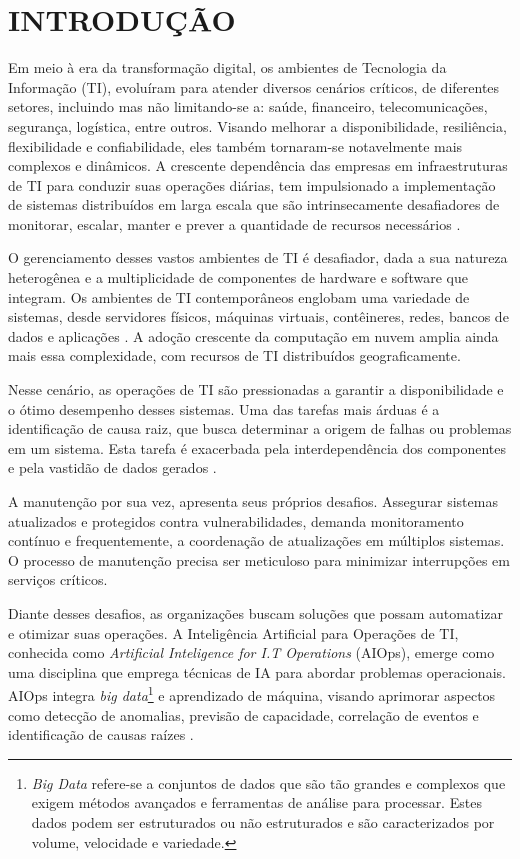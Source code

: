\chapter{INTRODUÇÃO} \label{cap_introducao}

Em meio à era da transformação digital, os ambientes de Tecnologia da Informação (TI), evoluíram para atender diversos cenários críticos, de diferentes setores, incluindo mas não limitando-se a: saúde, financeiro, telecomunicações, segurança, logística, entre outros. Visando melhorar a disponibilidade, resiliência,  flexibilidade e confiabilidade, eles também tornaram-se notavelmente mais complexos e dinâmicos. A crescente dependência das empresas em infraestruturas de TI para conduzir suas operações diárias, tem impulsionado a implementação de sistemas distribuídos em larga escala que são intrinsecamente desafiadores de monitorar, escalar, manter e prever a quantidade de recursos necessários \cite{pahl2015containerization}.

O gerenciamento desses vastos ambientes de TI é desafiador, dada a sua natureza heterogênea e a multiplicidade de componentes de hardware e software que integram. Os ambientes de TI contemporâneos englobam uma variedade de sistemas, desde servidores físicos, máquinas virtuais, contêineres, redes, bancos de dados e aplicações \cite{pahl2015containerization}. A adoção crescente da computação em nuvem amplia ainda mais essa complexidade, com recursos de TI distribuídos geograficamente.

Nesse cenário, as operações de TI são pressionadas a garantir a disponibilidade e o ótimo desempenho  desses sistemas. Uma das tarefas mais árduas é a identificação de causa raiz, que busca determinar a origem de falhas ou problemas em um sistema. Esta tarefa é exacerbada pela interdependência dos componentes e pela vastidão de dados gerados \cite{cohen2004correlating}.

A manutenção por sua vez, apresenta seus próprios desafios. Assegurar sistemas atualizados e protegidos contra vulnerabilidades, demanda monitoramento contínuo e frequentemente, a coordenação de atualizações em múltiplos sistemas. O processo de manutenção precisa ser meticuloso para minimizar interrupções em serviços  críticos.

Diante desses desafios, as organizações buscam soluções que possam automatizar e otimizar suas operações. A Inteligência Artificial para Operações de TI, conhecida como \textit{Artificial Inteligence for I.T Operations} (AIOps), emerge como uma disciplina que emprega técnicas de IA para abordar problemas operacionais. AIOps integra \textit{big data}\footnote{\textit{Big Data} refere-se a conjuntos de dados que são tão grandes e complexos que exigem métodos avançados e ferramentas de análise para processar. Estes dados podem ser estruturados ou não estruturados e são caracterizados por volume, velocidade e variedade.}
 e aprendizado de máquina, visando aprimorar aspectos como detecção de anomalias, previsão de capacidade, correlação de eventos e identificação de causas raízes \cite{sill2019aiops}.

